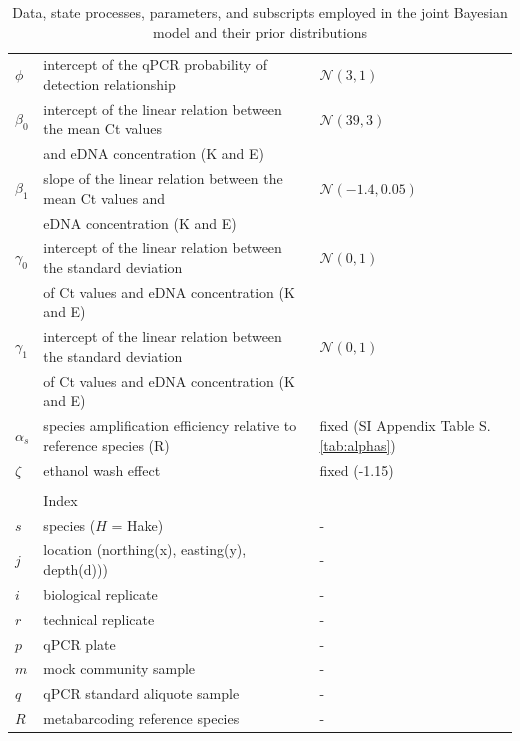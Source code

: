 \documentclass{article}
\begin{document}
\begin{table}[h]
\begin{tabular}{lll}
$\phi$& intercept of the qPCR probability of detection relationship & $\mathcal{N}(3,1)$\\
$\beta_0$& intercept of the linear relation between the mean Ct values&$\mathcal{N}(39,3)$\\
&and eDNA concentration (K and E) & \\
$\beta_1$& slope of the linear relation between the mean Ct values and &$\mathcal{N}(-1.4,0.05)$\\
&eDNA concentration (K and E) & \\
$\gamma_0$& intercept of the linear relation between the standard deviation&$\mathcal{N}(0,1)$\\
&of Ct values and eDNA concentration (K and E) & \\
$\gamma_1$& intercept of the linear relation between the standard deviation &$\mathcal{N}(0,1)$\\
&of Ct values and eDNA concentration (K and E) & \\
$\alpha_s$& species amplification efficiency relative to reference species (R) & fixed (SI Appendix Table S.\ref{tab:alphas})\\
$\zeta$& ethanol wash effect & fixed (-1.15)\\
&&\\
&Index&\\
\hline
$s$& species ($H$ = Hake) & -\\
$j$& location (northing(x), easting(y), depth(d)))& -\\
$i$& biological replicate & -\\
$r$& technical replicate & -\\
$p$& qPCR plate & -\\
$m$& mock community sample & -\\
$q$& qPCR standard aliquote sample & -\\
$R$& metabarcoding reference species & -\\


    \end{tabular}
    \caption{Data, state processes, parameters, and subscripts employed in the joint Bayesian model and their prior distributions}
    \label{tab:priortable}
\end{table}
\end{document}
